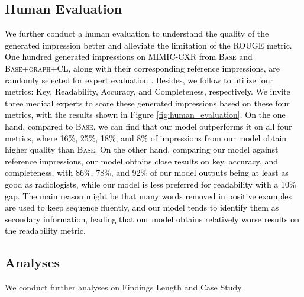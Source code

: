 \documentclass[11pt]{article}
\begin{document}
\subsection{Human Evaluation}
\textcolor{black}{
We further conduct a human evaluation to understand the quality of the generated impression better and alleviate the limitation of the ROUGE metric.
%
One hundred generated impressions on MIMIC-CXR from \textsc{Base} and \textsc{Base+graph+CL}, along with their corresponding reference impressions, are randomly selected for expert evaluation \cite{attend}.
%
Besides, we follow  to utilize four metrics: Key, Readability, Accuracy, and Completeness, respectively.
%
We invite three medical experts to score these generated impressions based on these four metrics, with the results shown in Figure \ref{fig:human_evaluation}.
%
\textcolor{black}{
On the one hand, compared to \textsc{Base}, we can find that our model outperforms it on all four metrics, where 16\%, 25\%, 18\%, and 8\% of impressions from our model obtain higher quality than \textsc{Base}.
On the other hand, comparing our model against reference impressions, our model obtains close results on key, accuracy, and completeness, with 86\%, 78\%, and 92\% of our model outputs being at least as good as radiologists, while our model is less preferred for readability with a 10\% gap.
%
%
The main reason might be that many words removed in positive examples are used to keep sequence fluently, and our model tends to identify them as secondary information, leading that our model obtains relatively worse results on the readability metric.
}
}




\subsection{Analyses}
We conduct further analyses on Findings Length and Case Study.
\end{document}
